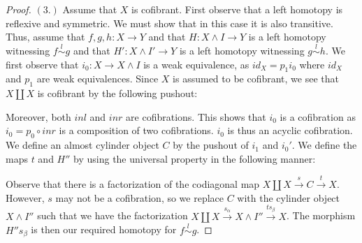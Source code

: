 \documentclass[../thesis.tex]{subfiles}
\begin{document}
\begin{proof}
                $(3.)$ Assume that $X$ is cofibrant. First observe that a left homotopy is reflexive and symmetric. We must show that in this case it is also transitive. Thus, assume that $f,g,h:X\rightarrow Y$ and that $H:X\wedge I\rightarrow Y$ is a left homotopy witnessing $f \overset{l}{\sim} g$ and that $H':X\wedge I'\rightarrow Y$ is a left homotopy witnessing $g\overset{l}{\sim} h$. We first observe that $i_0: X\rightarrow X\wedge I$ is a weak equivalence, as $id_X = p_1i_0$ where $id_X$ and $p_1$ are weak equivalences. Since $X$ is assumed to be cofibrant, we see that $X\coprod X$ is cofibrant by the following pushout:
                \begin{center}
                \end{center}
                Moreover, both $inl$ and $inr$ are cofibrations. This shows that $i_0$ is a cofibration as $i_0 = p_0\circ inr$ is a composition of two cofibrations. $i_0$ is thus an acyclic cofibration. We define an almost cylinder object $C$ by the pushout of $i_1$ and $i_0'$. We define the maps $t$ and $H''$ by using the universal property in the following manner:
                \begin{center}
                    \qquad
                \end{center}
                Observe that there is a factorization of the codiagonal map $X\coprod X \overset{s}{\rightarrow} C \overset{t}{\rightarrow} X$. However, $s$ may not be a cofibration, so we replace $C$ with the cylinder object $X\wedge I''$ such that we have the factorization $X\coprod X \overset{s_\alpha}{\rightarrow} X\wedge I'' \overset{ts_\beta}{\rightarrow} X$. The morphism $H''s_\beta$ is then our required homotopy for $f\overset{l}{\sim}g$.


\end{proof}
\end{document}
